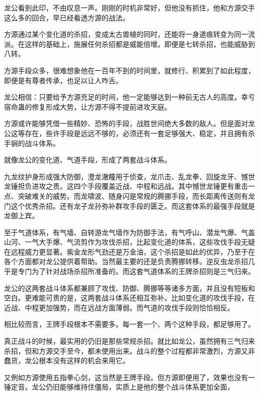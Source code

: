 \begin{this_body}
龙公看到此印，不由叹息一声。刚刚的时机非常好，但他没有抓住，他和方源交手这么多的回合，早已经看透方源的战法。

方源通过某个变化道的杀招，变成太古兽植的同时，还能将一身道痕转变为同一流派。在这样的基础上，施展任何杀招都是威能倍增。即便是七转杀招，也能威胁到八转。

方源手段众多，很难想象他在一百年不到的时间里，就修行、积累到了如此程度，即便是有尊者传承，也足以让人咋舌。

龙公相信：只要给予方源充足的时间，他一定能够达到一种前无古人的高度。幸亏宿命蛊的修复形成大势，让方源不得不提前进攻天庭。

方源或许能够凭借一些精妙、恐怖的手段，战胜世间绝大多数的敌人。但是面对龙公这等存在，些许手段是远远不够的，必须还有一套足够强大、稳定，并且拥有杀手锏的战斗体系。

就像龙公的变化道、气道手段，形成了两套战斗体系。

九龙纹护身形成强大防御，澄龙澈瞳用于侦查，龙爪击、乱龙拳、回旋龙牙、憾世龙锤担负进攻之责。这四个手段覆盖近战、中程和远战。其中憾世龙锤更有重击一点、突破难关的威势。而龙啸波、随身闪是常规的腾挪手段，而长距离传送则有龙门这个优秀杀招。还有龙子龙孙弥补群攻手段的匮乏。而这套体系的最强手段就是龙御上宾。

至于气道体系，有气墙、自转游龙气墙作为防御手法，有气呼山、潜龙气爆、气盖山河、一气大手爆、气流剪作为攻伐杀招，比起变化道的体系，这些攻伐手段无疑在远程威力更显著。紫金龙形气劲还是万金油，这个杀招是如此的优异，乃至于在各个方面都对龙公提供着帮助。当然最主要的还是负责腾挪转移。逆反虫龙杀招几乎是专门为了针对战场杀招所准备的。而这套气道体系的王牌杀招则是三气归来。

龙公的这两套战斗体系都兼顾了攻伐、防御、腾挪等等诸多方面，并且没有短板和空白。更难能可贵的是，这两套战斗体系还相互弥补。比如变化道的攻伐手段，在近战、中程更加强势，而在远战方面薄弱。而气道的攻伐手段则恰恰相反。

相比较而言，王牌手段根本不需要多。每一套一个、两个这种手段，都足够用了。

真正战斗的时候，最实用的仍旧是那些常规杀招。就比如龙公，虽然拥有三气归来杀招，但和方源交手至今，都未使用出来。战斗的整个过程都非常激烈，方源又非蠢货，龙公根本没有这样的机会来用它。

又例如方源使用五指拳心剑，这当然是王牌手段。但方源即便用了，效果也没有一锤定音。龙公仍旧能够维持住僵局，实质上是他的整个战斗体系更加全面，

\end{this_body}

